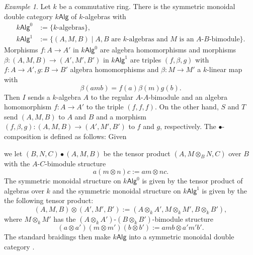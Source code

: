 \documentclass[11pt]{report}
\theoremstyle{definition}
\theoremstyle{remark}
\theoremstyle{remark}
\newtheorem*{example}{Example}
\begin{document}
\begin{example}
Let $k$ be a commutative ring. There is the symmetric monoidal double category $k\mathsf{Alg}$ of $k$-algebras with
\begin{align*}
k\mathsf{Alg}^0 &:= \{ k\text{-algebras} \}, \\
k\mathsf{Alg}^1 &:= \{ (A,M,B) \mid A,B \text{ are } k\text{-algebras and } M \text{ is an } A\text{-}B\text{-bimodule} \}.
\end{align*}
Morphisms $f: A \to A'$ in $k\mathsf{Alg}^0$ are algebra homomorphisms and morphisms $\beta: (A,M,B) \to (A',M',B')$ in $k\mathsf{Alg}^1$ are triples $(f,\beta,g)$ with $f: A \to A', g: B \to B'$ algebra homomorphisms and $\beta: M \to M'$ a $k$-linear map with
\begin{equation*}
\beta(amb) = f(a) \beta(m) g(b).
\end{equation*}
Then $I$ sends a $k$-algebra $A$ to the regular $A$-$A$-bimodule and an algebra homomorphism $f: A \to A'$ to the triple $(f,f,f)$. On the other hand, $S$ and $T$ send $(A,M,B)$ to $A$ and $B$ and a morphism $(f,\beta,g): (A,M,B) \to (A',M',B')$ to $f$ and $g$, respectively. The $\bullet$-composition is defined as follows: Given
\begin{center}
\end{center}
we let $(B,N,C) \bullet (A,M,B)$ be the tensor product $(A,M \otimes_B N,C)$ over $B$ with the $A$-$C$-bimodule structure
\begin{equation*}
a(m \otimes n)c := am \otimes nc.
\end{equation*}
The symmetric monoidal structure on $k\mathsf{Alg}^0$ is given by the tensor product of algebras over $k$ and the symmetric monoidal structure on $k\mathsf{Alg}^1$ is given by the the following tensor product:
\begin{equation*}
(A,M,B) \otimes (A',M',B') := (A \otimes_k A',M \otimes_k M',B \otimes_k B'),
\end{equation*}
where $M \otimes_k M'$ has the $(A \otimes_k A')$-$(B \otimes_k B')$-bimodule structure
\begin{equation*}
(a \otimes a')(m \otimes m')(b \otimes b') := amb \otimes a'm'b'.
\end{equation*}
The standard braidings then make $k\mathsf{Alg}$ into a symmetric monoidal double category \cite{article:hansen:2019}.
\end{example}
\end{document}
